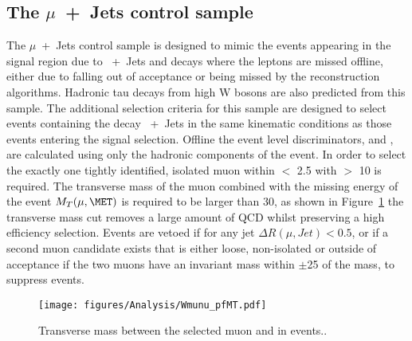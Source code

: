 \subsection{The $\mu$~+~Jets control sample} %
\label{par:the_mu_jets_control_sample}
The $\mu$~+~Jets control sample is designed to mimic the events appearing in 
the signal region due to \HepProcess{\PW}~+~Jets and \HepProcess{\Ptop\APtop} 
decays where the leptons are missed offline, either due to falling out of 
acceptance or being missed by the reconstruction algorithms. Hadronic tau 
decays from high \PT W bosons are also predicted from this sample.
The additional selection criteria for this sample are designed to select events 
containing the decay \HepProcess{\PW\to\mu\nu}~+~Jets in the same kinematic 
conditions as those events entering the signal selection. Offline the event 
level discriminators, \HT and \alt, are calculated using only the hadronic 
components of the event. In order to select the \HepProcess{\PW} exactly one 
tightly identified, isolated muon within \mETA $<$ 2.5 with \PT $>$ 
\unit{10}{\GeV} is required. The transverse mass of the muon combined with the 
missing energy of the event $M_{T}(\mu,\MET)$ is required to be larger than 
\unit{30}{\GeV}, as shown in Figure~\ref{fig:figures_Analysis_Wmunu_pfMT} the 
transverse mass cut removes a large amount of QCD whilst preserving a high 
efficiency \HepProcess{\PW} selection. Events are vetoed if for any jet $\Delta 
R(\mu,Jet) < 0.5$, or if a second muon candidate exists that is either loose, 
non-isolated or outside of acceptance if the two muons have an invariant mass 
within $\pm$\unit{25}{\GeV} of the \PZ mass, to suppress 
\HepProcess{\PZ\to\mu\mu} events.


\begin{figure}[htbp]
  \centering
    \texttt{[image: figures/Analysis/Wmunu\_pfMT.pdf]}
  \caption{Transverse mass between the selected muon and \MET in 
           \HepProcess{\PW\to\mu\nu} events.\cite{CMS-AN-10-264}.}
  \label{fig:figures_Analysis_Wmunu_pfMT}
\end{figure}


